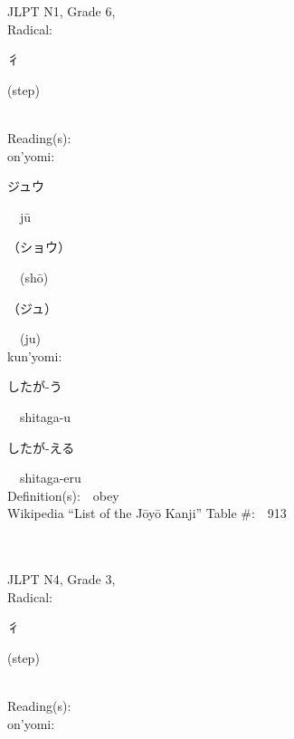 \begin{multicols}{2}
{JLPT N1, Grade 6, \\Radical:\ \ {\begin{CJK}{UTF8}{min} 彳 \end{CJK}} (step) } \\
Reading(s):\ \ \\
{\hspace*{1em}}on'yomi:\ \ \\
{\hspace*{2em}}{\begin{CJK}{UTF8}{min} ジュウ \end{CJK}}\ \ j\=u\ \ \\
{\hspace*{2em}}{\begin{CJK}{UTF8}{min} （ショウ） \end{CJK}}\ \ (sh\=o)\ \ \\
{\hspace*{2em}}{\begin{CJK}{UTF8}{min} （ジュ） \end{CJK}}\ \ (ju)\ \ \\
{\hspace*{1em}}kun'yomi:\ \ \\
{\hspace*{2em}}{\begin{CJK}{UTF8}{min} したが-う \end{CJK}}\ \ shitaga-u\ \ \\
{\hspace*{2em}}{\begin{CJK}{UTF8}{min} したが-える \end{CJK}}\ \ shitaga-eru\ \ \\
Definition(s):\ \ obey \\
Wikipedia ``List of the J\=oy\=o Kanji'' Table \#:\ \ 913 \\
\ \ \\
{\fontsize{34pt}{40pt}  }\ \ \\  %
{JLPT N4, Grade 3, \\Radical:\ \ {\begin{CJK}{UTF8}{min} 彳 \end{CJK}} (step) } \\
Reading(s):\ \ \\
{\hspace*{1em}}on'yomi:\ \ \\

\end{multicols}
